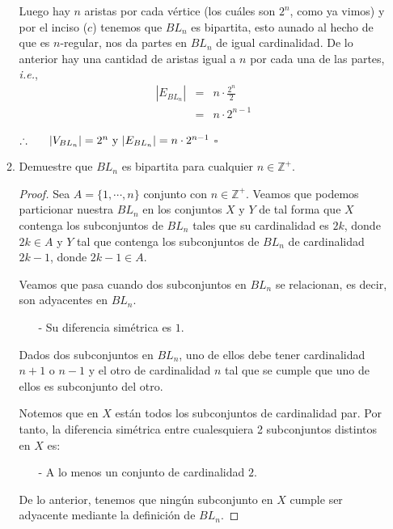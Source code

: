 \documentclass{article}
\begin{document}
\begin{enumerate}
\begin{enumerate}
        Luego hay $n$ aristas por cada vértice (los cuáles son
        $2^n$, como ya vimos) y por el inciso ($c$) tenemos que
        $BL_n$ es bipartita, esto aunado al hecho de que es
        $n$-regular, nos da partes en $BL_n$ de igual
        cardinalidad. De lo anterior hay una cantidad de aristas
        igual a $n$ por cada una de las partes, \textit{i.e.},
        \begin{eqnarray*}
          |E_{BL_n}| &=& n \cdot \frac{2^n}{2}\\
          &=& n \cdot 2^{n - 1}
        \end{eqnarray*}


        \hspace*{4 cm} $\therefore\ \ \ \ \ \abs{V_{BL_n}} = 2^n
        \text{ y } |E_{BL_n}| = n \cdot 2^{n -1}$
        \hfill $\square$

      \item Demuestre que $BL_n$ es bipartita para cualquier $n \in \mathbb{Z}^+$.

      \begin{proof}

        Sea $A = \{1, \dotsm,n\}$ conjunto con $n \in \mathbb{Z}^+$.
        Veamos que podemos particionar nuestra $BL_n$ en los conjuntos
        $X$ y $Y$ de tal forma que $X$ contenga los subconjuntos de
        $BL_n$ tales que su cardinalidad es $2k$, donde $2k \in A$  y
        $Y$ tal que contenga los subconjuntos de $BL_n$ de cardinalidad
        $2k -1$, donde $2k -1 \in A$.

        Veamos que pasa cuando dos subconjuntos en $BL_n$ se relacionan,
        es decir, son adyacentes en $BL_n$.
        \begin{itemize}
        \item[-] Su diferencia simétrica es $1$.
        \end{itemize}
        Dados dos subconjuntos en $BL_n$, uno de ellos debe tener cardinalidad
        $n+1$ o $n-1$ y el otro de cardinalidad $n$ tal que se cumple que uno
        de ellos es subconjunto del otro.

        Notemos que en $X$ están todos los subconjuntos de cardinalidad par.
        Por tanto, la diferencia simétrica entre cualesquiera 2 subconjuntos
        distintos en $X$ es:
        \begin{itemize}
        \item[-] A lo menos un conjunto de cardinalidad $2$.
        \end{itemize}
        De lo anterior, tenemos que ningún subconjunto en
        $X$ cumple ser adyacente mediante la definición de $BL_n$.


\end{proof}
\end{enumerate}
\end{enumerate}
\end{document}
